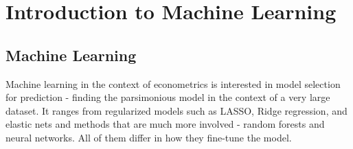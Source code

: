 

\chapter{Introduction to Machine Learning}
\section{Machine Learning}
Machine learning in the context of econometrics is interested in model selection for prediction - finding the parsimonious model in the context of a very large dataset. It ranges from regularized models such as LASSO, Ridge regression, and elastic nets and methods that are much more involved - random forests and neural networks. All of them differ in how they fine-tune the model. \par
